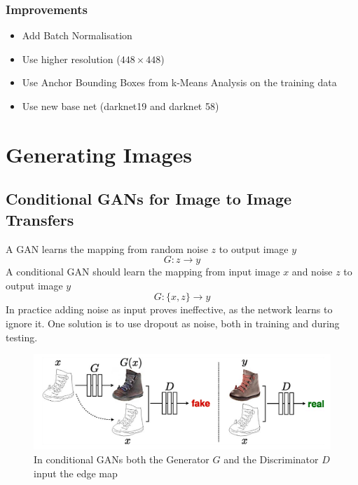 \documentclass[x11names,11pt,a4paper]{article}
\theoremstyle{definition}
\begin{document}
\subsubsection{Improvements}
\begin{itemize}[label=-]
	\item Add Batch Normalisation
	\item Use higher resolution ($448\times 448$)
	\item Use Anchor Bounding Boxes from k-Means Analysis on the training data
	\item Use new base net (darknet19 and darknet 58)
\end{itemize}

\section{Generating Images}

\subsection{Conditional GANs for Image to Image Transfers}
A GAN learns the mapping from random noise $z$ to output image $y$
\begin{equation*}
	G: z \rightarrow y
\end{equation*}
A conditional GAN should learn the mapping from input image $x$ and noise $z$ to output image $y$
\begin{equation*}
	G: \{x,z\} \rightarrow y
\end{equation*}
In practice adding noise as input proves ineffective, as the network learns to ignore it. One solution is to use dropout as noise, both in training and during testing.
\begin{figure}[H]
	\centering
	\includegraphics[width=0.7\linewidth]{img/conditional_GAN_edge_map}
	\caption{In conditional GANs both the Generator $G$ and the Discriminator $D$ input the edge map}
	\label{fig:conditionalganedgemap}
\end{figure}
\end{document}
